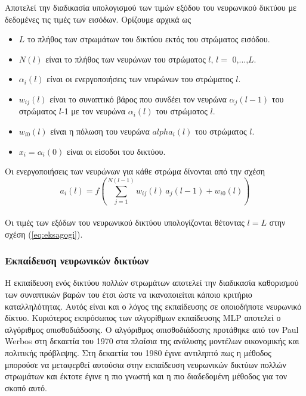 \documentclass[12pt]{article}
\numberwithin{equation}{section}
\begin{document}
Αποτελεί την διαδικασία υπολογισμού των τιμών εξόδου του νευρωνικού δικτύου με δεδομένες τις τιμές των εισόδων. Ορίζουμε αρχικά ως

\begin{itemize}
  \item \(L\) το πλήθος των στρωμάτων του δικτύου εκτός του στρώματος εισόδου.
  \item \(N(l)\) είναι το πλήθος των νευρώνων του στρώματος \(l\), \(l =\) 0,...,\(L\).
  \item \(\alpha_i(l)\) είναι οι ενεργοποιήσεις των νευρώνων του στρώματος \(l\).
  \item \(w_{ij}(l)\) είναι το συναπτικό βάρος που συνδέει τον νευρώνα \(\alpha_j(l-1)\) του στρώματος \(l\)-1 με τον νευρώνα \(\alpha_i(l)\) του στρώματος \(l\).
   \item \(w_{i0}(l)\) είναι η πόλωση του νευρώνα \(alpha_i(l)\) του στρώματος \(l\).
   \item \(x_i = \alpha_i(0)\) είναι οι είσοδοι του δικτύου.
\end{itemize}  

\noindent Οι ενεργοποιήσεις των νευρώνων για κάθε στρώμα δίνονται από την σχέση\\

\begin{equation}
\label{eq:eksagogi}
a_i(l) = f\left( \sum_{j=1}^{N(l-1)} w_{ij}(l) \, a_j(l-1) + w_{i0}(l) \right)
\end{equation} \\

\noindent Οι τιμές των εξόδων του νευρωνικού δικτύου υπολογίζονται θέτοντας \(l = L\) στην σχέση (\ref{eq:eksagogi}).\\

\subsubsection{Εκπαίδευση νευρωνικών δικτύων}
\label{subsubsec:NeuralNetworksTrain}
Η εκπαίδευση ενός δικτύου πολλών στρωμάτων αποτελεί την διαδικασία καθορισμού των συναπτικών βαρών του έτσι ώστε να ικανοποιείται κάποιο κριτήριο καταλληλότητας. Αυτός είναι και ο λόγος της εκπαίδευσης σε οποιοδήποτε νευρωνικό δίκτυο. Κυριότερος εκπρόσωπος των αλγορίθμων εκπαίδευσης MLP αποτελεί ο αλγόριθμος οπισθοδιάδοσης. Ο αλγόριθμος οπισθοδιάδοσης προτάθηκε από τον Paul Werbos στη δεκαετία του 1970 στα πλαίσια της ανάλυσης μοντέλων οικονομικής και πολιτικής πρόβλεψης. Στη δεκαετία του 1980 έγινε αντιληπτό πως η μέθοδος μπορούσε να μεταφερθεί αυτούσια στην εκπαίδευση νευρωνικών δικτύων πολλών στρωμάτων και έκτοτε έγινε η πιο γνωστή και η πιο διαδεδομένη μέθοδος για τον σκοπό αυτό. \\
\end{document}
